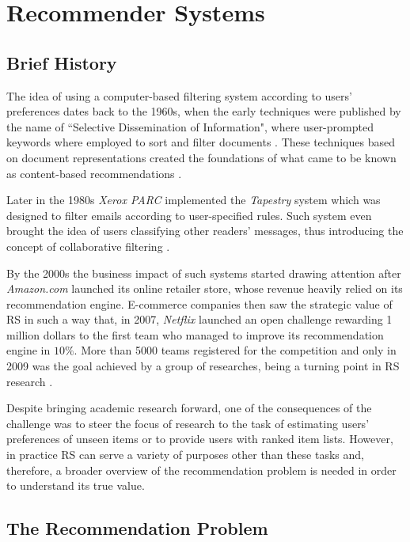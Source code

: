\section{Recommender Systems}

\subsection{Brief History}

    The idea of using a computer-based filtering system according to users' preferences dates back to 
    the 1960s, when the early techniques were published by the name of ``Selective Dissemination of Information", 
    where user-prompted keywords where employed to sort and filter documents \cite{1963SDI}. These techniques 
    based on document representations created the foundations of what came to be known as 
    content-based recommendations \cite{2016BeyondMatrixCompletion}. 

    Later in the 1980s \textit{Xerox PARC} implemented the \textit{Tapestry} system which was designed to 
    filter emails according to user-specified rules. Such system even brought the idea of users 
    classifying other readers' messages, thus introducing the concept of collaborative filtering
    \cite{2016BeyondMatrixCompletion}.

    By the 2000s the business impact of such systems started drawing attention after 
    \textit{Amazon.com} launched its online retailer store, whose revenue heavily 
    relied on its recommendation engine. E-commerce companies then saw 
    the strategic value of RS in such a way that, in 2007, \textit{Netflix} launched an open challenge 
    rewarding 1 million dollars to the first team who managed to improve its recommendation engine in 
    $10 \%$. More than 5000 teams registered for the competition and only in 2009 was the goal achieved 
    by a group of researches, being a turning point in RS research \cite{2007TheNetflixPrize}.
    
    Despite bringing academic research forward, one of the consequences of the challenge was to steer 
    the focus of research to the task of estimating users' preferences of unseen items or to provide users with 
    ranked item lists. However, in practice RS can serve a variety of purposes other than these tasks and, 
    therefore, a broader overview of the recommendation problem is needed in order to understand its 
    true value.

  \subsection{The Recommendation Problem}

